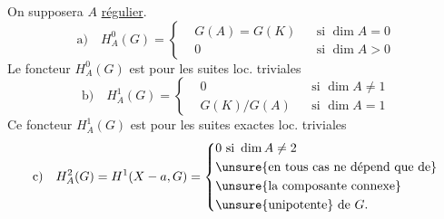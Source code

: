 On supposera $A$ \uline{régulier}.
\[
\text{a)}\quad H_A^0(G)=\left\{\begin{aligned}
&G(A)=G(K)&&\text{si }\dim A=0\\
&0&&\text{si }\dim A>0
\end{aligned}\right.
\]
Le foncteur $H_A^0(G)$ est  pour les suites   loc. triviales
\[
\text{b)}\quad H_A^1(G)=\left\{\begin{aligned}
&0&&\text{si }\dim A\neq1\\
&G(K)/G(A)&&\text{si }\dim A=1
\end{aligned}\right.
\]
Ce foncteur $H_A^1(G)$ est  pour les suites exactes loc. triviales
\[
\text{c)}\quad H_A^2(G)=H^1(X-a,G)=\left\{\begin{aligned}
&0\text{ si }\dim A\neq2\\
&\text{\unsure{en tous cas ne dépend que de}}\\
&\text{\unsure{la composante connexe}}\\
&\text{\unsure{unipotente} de }G.
\end{aligned}\right.
\]
